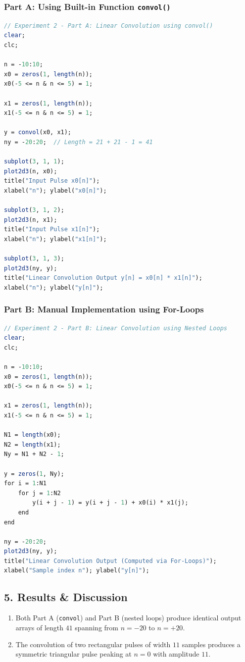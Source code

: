 \documentclass[11pt,a4paper]{article}
\begin{document}
\subsubsection*{Part A: Using Built-in Function \texttt{convol()}}
\begin{lstlisting}[language=Scilab]
// Experiment 2 - Part A: Linear Convolution using convol()
clear;
clc;

n = -10:10;
x0 = zeros(1, length(n));
x0(-5 <= n & n <= 5) = 1;

x1 = zeros(1, length(n));
x1(-5 <= n & n <= 5) = 1;

y = convol(x0, x1);
ny = -20:20;  // Length = 21 + 21 - 1 = 41

subplot(3, 1, 1);
plot2d3(n, x0);
title("Input Pulse x0[n]");
xlabel("n"); ylabel("x0[n]");

subplot(3, 1, 2);
plot2d3(n, x1);
title("Input Pulse x1[n]");
xlabel("n"); ylabel("x1[n]");

subplot(3, 1, 3);
plot2d3(ny, y);
title("Linear Convolution Output y[n] = x0[n] * x1[n]");
xlabel("n"); ylabel("y[n]");
\end{lstlisting}

\subsubsection*{Part B: Manual Implementation using For-Loops}
\begin{lstlisting}[language=Scilab]
// Experiment 2 - Part B: Linear Convolution using Nested Loops
clear;
clc;

n = -10:10;
x0 = zeros(1, length(n));
x0(-5 <= n & n <= 5) = 1;

x1 = zeros(1, length(n));
x1(-5 <= n & n <= 5) = 1;

N1 = length(x0);
N2 = length(x1);
Ny = N1 + N2 - 1;

y = zeros(1, Ny);
for i = 1:N1
    for j = 1:N2
        y(i + j - 1) = y(i + j - 1) + x0(i) * x1(j);
    end
end

ny = -20:20;
plot2d3(ny, y);
title("Linear Convolution Output (Computed via For-Loops)");
xlabel("Sample index n"); ylabel("y[n]");
\end{lstlisting}

\subsection*{5. Results \& Discussion}
\begin{enumerate}
    \item Both Part A (\texttt{convol}) and Part B (nested loops) produce identical output arrays of length $41$ spanning from $n = -20$ to $n = +20$.
    \item The convolution of two rectangular pulses of width $11$ samples produces a symmetric triangular pulse peaking at $n = 0$ with amplitude $11$.
\end{enumerate}
\end{document}
